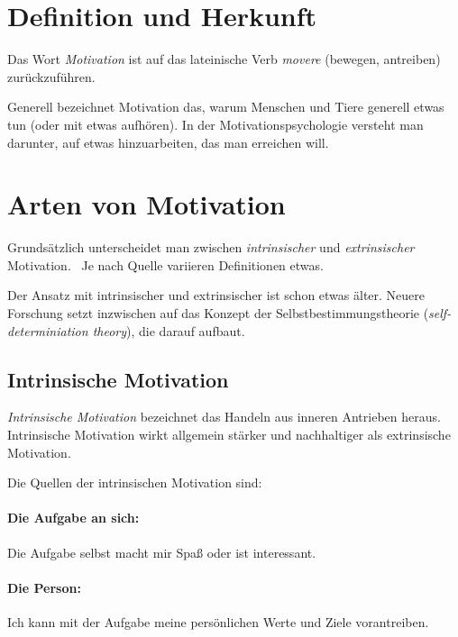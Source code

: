 \section{Definition und Herkunft}

Das Wort \emph{Motivation} ist auf das lateinische Verb \emph{movere} (bewegen, antreiben) zurückzuführen.~\cite{duden-herkunft}

Generell bezeichnet Motivation das, warum Menschen und Tiere generell etwas tun (oder mit etwas aufhören). In der Motivationspsychologie versteht man darunter, auf etwas hinzuarbeiten, das man erreichen will. \cite{rheinberg-motivation}


\section{Arten von Motivation}

Grundsätzlich unterscheidet man zwischen \emph{intrinsischer} und \emph{extrinsischer} Motivation.~\cite{self-determiniation-theory, pelz-motivation} Je nach Quelle variieren Definitionen etwas.

Der Ansatz mit intrinsischer und extrinsischer ist schon etwas älter. Neuere Forschung setzt inzwischen auf das Konzept der Selbstbestimmungstheorie (\emph{self-determiniation theory}), die darauf aufbaut.

\subsection{Intrinsische Motivation}
\label{intrinsische-motivation}

\emph{Intrinsische Motivation} bezeichnet das Handeln aus inneren Antrieben heraus. Intrinsische Motivation wirkt allgemein stärker und nachhaltiger als extrinsische Motivation.

Die Quellen der intrinsischen Motivation sind:

\paragraph{Die Aufgabe an sich:} Die Aufgabe selbst macht mir Spaß oder ist interessant.

\paragraph{Die Person:} Ich kann mit der Aufgabe meine persönlichen Werte und Ziele vorantreiben.

